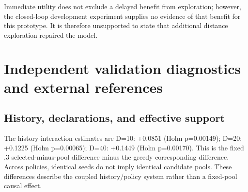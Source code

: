 \documentclass[suppldata]{interact}
\begin{document}
\endgroup

Immediate utility does not exclude a delayed benefit from exploration; however, the closed-loop development experiment supplies no evidence of that benefit for this prototype. It is therefore unsupported to state that additional distance exploration repaired the model.

\hypertarget{independent-validation-diagnostics-and-external-references}{%
\section{Independent validation diagnostics and external references}\label{independent-validation-diagnostics-and-external-references}}

\hypertarget{history-declarations-and-effective-support}{%
\subsection{History, declarations, and effective support}\label{history-declarations-and-effective-support}}

The history-interaction estimates are D=10: +0.0851 (Holm p=0.00149); D=20: +0.1225 (Holm p=0.00065); D=40: +0.1449 (Holm p=0.00170). This is the fixed .3 selected-minus-pool difference minus the greedy corresponding difference. Across policies, identical seeds do not imply identical candidate pools. These differences describe the coupled history/policy system rather than a fixed-pool causal effect.

\FloatBarrier\begingroup\fontsize{8.5}{10.5}\selectfont\setlength\tabcolsep{3pt}
\end{document}
